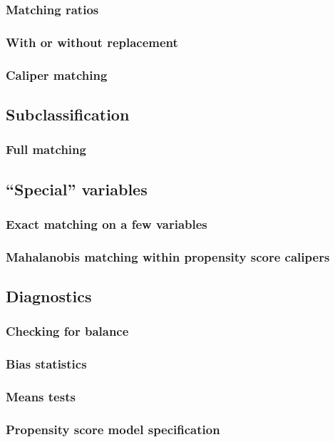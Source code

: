 \documentclass[11pt,titlepage]{article}
\begin{document}
\subsubsection{Matching ratios}
\subsubsection{With or without replacement}
\subsubsection{Caliper matching}
\subsection{Subclassification}
\subsubsection{Full matching}
\subsection{``Special'' variables}
\subsubsection{Exact matching on a few variables}
\subsubsection{Mahalanobis matching within propensity score calipers}
\subsection{Diagnostics}
\subsubsection{Checking for balance}
\subsubsection{Bias statistics}
\subsubsection{Means tests}
\subsubsection{Propensity score model specification}
\end{document}
